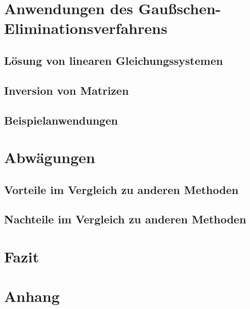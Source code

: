 \documentclass[a4paper, 12pt]{report}
\begin{document}
\begin{sloppypar}
\chapter{Anwendungen des Gaußschen-Eliminationsverfahrens}
\section{Lösung von linearen Gleichungssystemen}
\section{Inversion von Matrizen}
\section{Beispielanwendungen}
\chapter{Abwägungen}
\section{Vorteile im Vergleich zu anderen Methoden}
\section{Nachteile im Vergleich zu anderen Methoden}
\chapter{Fazit}
\chapter{Anhang}

\printbibliography
\end{sloppypar}
\end{document}
